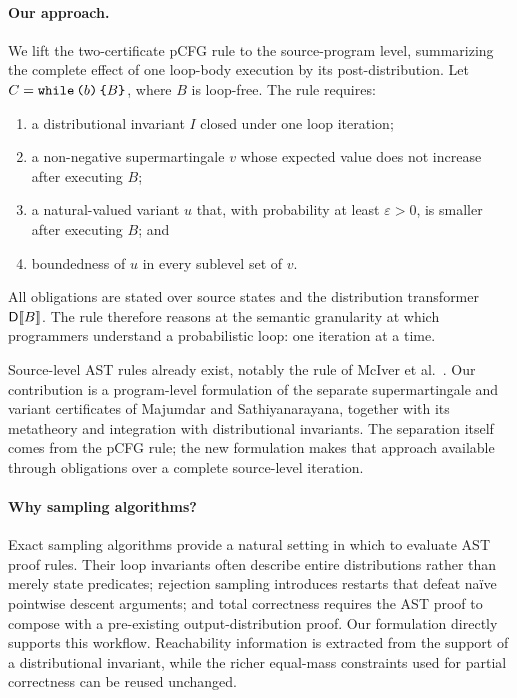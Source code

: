 \paragraph{Our approach.}
We lift the two-certificate pCFG rule to the source-program level, summarizing the complete effect of one loop-body execution by its post-distribution. Let $C=\textnormal{\texttt{while}}\,\textnormal{\texttt{(}} b\textnormal{\texttt{)}}\,\textnormal{\texttt{\{}} B\textnormal{\texttt{\}}}$, where $B$ is loop-free. The rule requires:
\begin{enumerate}[label=(\roman*)]
  \item a distributional invariant $I$ closed under one loop iteration;
  \item a non-negative supermartingale $v$ whose expected value does not increase after executing $B$;
  \item a natural-valued variant $u$ that, with probability at least $\varepsilon>0$, is smaller after executing $B$; and
  \item boundedness of $u$ in every sublevel set of $v$.
\end{enumerate}
All obligations are stated over source states and the distribution transformer $\mathsf{D}\llbracket B\rrbracket$. The rule therefore reasons at the semantic granularity at which programmers understand a probabilistic loop: one iteration at a time.

Source-level AST rules already exist, notably the rule of McIver et al.~\cite{10.1145/3158121}. Our contribution is a program-level formulation of the separate supermartingale and variant certificates of Majumdar and Sathiyanarayana, together with its metatheory and integration with distributional invariants. The separation itself comes from the pCFG rule; the new formulation makes that approach available through obligations over a complete source-level iteration.

\paragraph{Why sampling algorithms?}
Exact sampling algorithms provide a natural setting in which to evaluate AST proof rules. Their loop invariants often describe entire distributions rather than merely state predicates; rejection sampling introduces restarts that defeat na\"ive pointwise descent arguments; and total correctness requires the AST proof to compose with a pre-existing output-distribution proof. Our formulation directly supports this workflow. Reachability information is extracted from the support of a distributional invariant, while the richer equal-mass constraints used for partial correctness can be reused unchanged.

